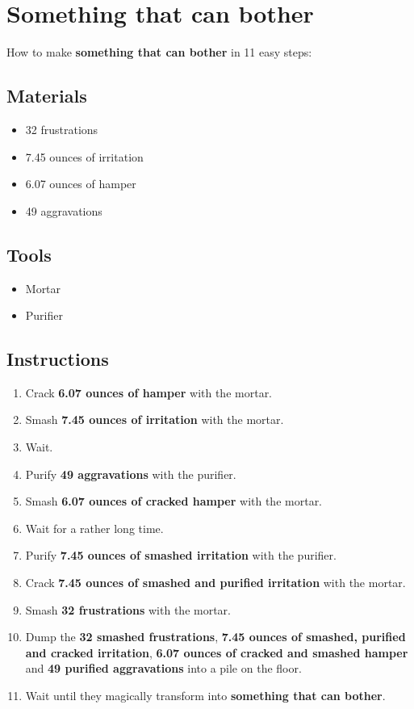 \documentclass{article}
\begin{document}
\section{Something that can bother}How to make \textbf{something that can bother} in 11 easy steps:

\subsection{Materials}\begin{itemize}
\item 
32 frustrations
\item 
7.45 ounces of irritation
\item 
6.07 ounces of hamper
\item 
49 aggravations
\end{itemize}
\subsection{Tools}\begin{itemize}
\item 
Mortar
\item 
Purifier
\end{itemize}
\subsection{Instructions}\begin{enumerate}
\item 
Crack \textbf{6.07 ounces of hamper} with the mortar.
\item 
Smash \textbf{7.45 ounces of irritation} with the mortar.
\item 
Wait.
\item 
Purify \textbf{49 aggravations} with the purifier.
\item 
Smash \textbf{6.07 ounces of cracked hamper} with the mortar.
\item 
Wait for a rather long time.
\item 
Purify \textbf{7.45 ounces of smashed irritation} with the purifier.
\item 
Crack \textbf{7.45 ounces of smashed and purified irritation} with the mortar.
\item 
Smash \textbf{32 frustrations} with the mortar.
\item 
Dump the \textbf{32 smashed frustrations}, \textbf{7.45 ounces of smashed, purified and cracked irritation}, \textbf{6.07 ounces of cracked and smashed hamper} and \textbf{49 purified aggravations} into a pile on the floor.
\item 
Wait until they magically transform into \textbf{something that can bother}.
\end{enumerate}
\newpage
\end{document}
